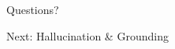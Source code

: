 \documentclass[aspectratio=169]{beamer}
\begin{document}
\begin{frame}
\begin{center}
\vspace{2cm}
{\Huge \textcolor{popblue}{Questions?}}

\vspace{1cm}
{\large Next: Hallucination \& Grounding}
\end{center}
\end{frame}
\end{document}
